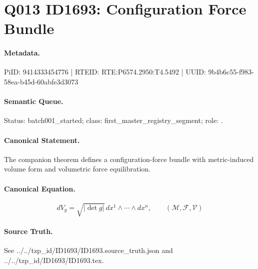 \section*{Q013 ID1693: Configuration Force Bundle}
\paragraph{Metadata.}
PiID: 9414333454776 | RTEID: RTE:P6574.2950:T4.5492 | UUID: 9b4b6c55-f983-58ea-b45d-60abfe3d3073

\paragraph{Semantic Queue.}
Status: batch001\_started; class: first\_master\_registry\_segment; role: .

\paragraph{Canonical Statement.}
The companion theorem defines a configuration-force bundle with metric-induced volume form and volumetric force equilibration.

\paragraph{Canonical Equation.}
\[
dV_g=\sqrt{|\det g|}\,dx^1\wedge\cdots\wedge dx^n,\qquad(\mathcal{M},\mathcal{F},\mathcal{V})
\]

\paragraph{Source Truth.}
See ../../tzp\_id/ID1693/ID1693.source\_truth.json and ../../tzp\_id/ID1693/ID1693.tex.
